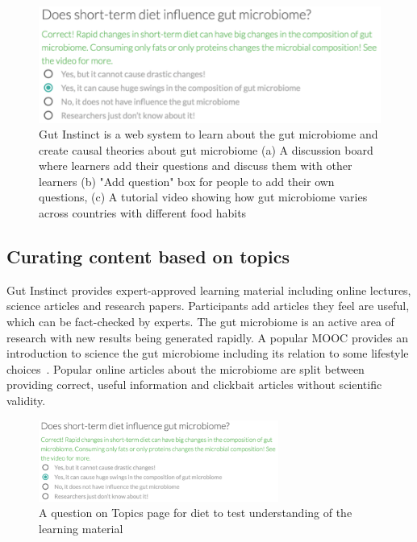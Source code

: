 \begin{figure}[h] 
  \centering
  \includegraphics[width=1.0\textwidth]{figures/gutinstinct/gi-3.png}
  \caption[Gut Instinct is a web system to learn about the gut microbiome and create causal theories about gut microbiome]
{ Gut Instinct is a web system to learn about the gut microbiome and create causal theories about gut microbiome (a) A discussion board where learners add their questions and discuss them with other learners (b) "Add question" box for people to add their own questions, (c) A tutorial video showing how gut microbiome varies across countries with different food habits~\cite{Yatsunenko2012}}
  \label{fig:gi-3}
\end{figure}

\subsection{Curating content based on topics}
Gut Instinct provides expert-approved learning material including online lectures, science articles and research papers. Participants add articles they feel are useful, which can be fact-checked by experts. The gut microbiome is an active area of research with new results being generated rapidly. A popular MOOC provides an introduction to science the gut microbiome including its relation to some lifestyle choices~\cite{Knight2016}. Popular online articles about the microbiome are split between providing correct, useful information and clickbait articles without scientific validity.


\begin{figure}[h]
  \centering
  \includegraphics[width=0.7\textwidth]{figures/gutinstinct/gi-4.png}
  \caption[A question on Topics page for diet to test understanding of the learning material]
{A question on Topics page for diet to test understanding of the learning material }
  \label{fig:gi-4}
\end{figure}

